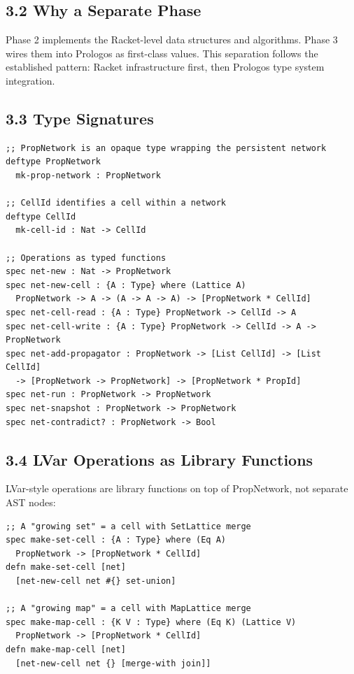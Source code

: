 \documentclass[11pt]{article}
\begin{document}
\subsection{3.2 Why a Separate Phase}
\label{sec:orgcac9639}

Phase 2 implements the Racket-level data structures and algorithms. Phase 3
wires them into Prologos as first-class values. This separation follows
the established pattern: Racket infrastructure first, then Prologos type
system integration.
\subsection{3.3 Type Signatures}
\label{sec:orgca00843}

\begin{verbatim}
;; PropNetwork is an opaque type wrapping the persistent network
deftype PropNetwork
  mk-prop-network : PropNetwork

;; CellId identifies a cell within a network
deftype CellId
  mk-cell-id : Nat -> CellId

;; Operations as typed functions
spec net-new : Nat -> PropNetwork
spec net-new-cell : {A : Type} where (Lattice A)
  PropNetwork -> A -> (A -> A -> A) -> [PropNetwork * CellId]
spec net-cell-read : {A : Type} PropNetwork -> CellId -> A
spec net-cell-write : {A : Type} PropNetwork -> CellId -> A -> PropNetwork
spec net-add-propagator : PropNetwork -> [List CellId] -> [List CellId]
  -> [PropNetwork -> PropNetwork] -> [PropNetwork * PropId]
spec net-run : PropNetwork -> PropNetwork
spec net-snapshot : PropNetwork -> PropNetwork
spec net-contradict? : PropNetwork -> Bool
\end{verbatim}
\subsection{3.4 LVar Operations as Library Functions}
\label{sec:org279712d}

LVar-style operations are library functions on top of PropNetwork, not
separate AST nodes:

\begin{verbatim}
;; A "growing set" = a cell with SetLattice merge
spec make-set-cell : {A : Type} where (Eq A)
  PropNetwork -> [PropNetwork * CellId]
defn make-set-cell [net]
  [net-new-cell net #{} set-union]

;; A "growing map" = a cell with MapLattice merge
spec make-map-cell : {K V : Type} where (Eq K) (Lattice V)
  PropNetwork -> [PropNetwork * CellId]
defn make-map-cell [net]
  [net-new-cell net {} [merge-with join]]
\end{verbatim}
\end{document}
